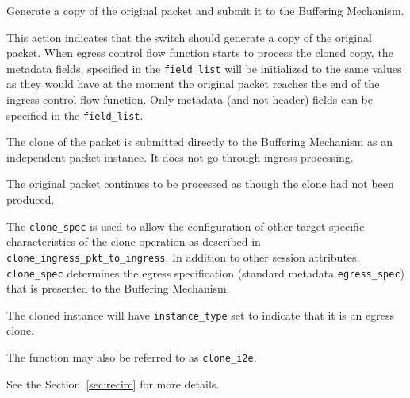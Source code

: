 \documentclass[12pt]{article}
\begin{document}
{ %
Generate a copy of the original packet and submit it to the Buffering Mechanism.
}
{ %
}
{ %
{
\color{red}
This action indicates that the switch should generate a copy of the original packet. When egress control flow function starts to process the cloned copy, the metadata fields, specified in the \texttt{field_list} will be initialized to the same values as they would have at the moment the original packet reaches the end of the ingress control flow function. Only metadata (and not header) fields can be specified in the \texttt{field_list}.
}

The clone of the packet is submitted directly to the Buffering Mechanism as 
an independent packet instance. It does not go through ingress \matchaction 
processing.

The original packet continues to be processed as though the clone had not 
been produced.

The \texttt{clone_spec} is used to allow the configuration of other target specific 
characteristics of the clone operation as described in \texttt{clone_ingress_pkt_to_ingress}. 
In addition to other session attributes, \texttt{clone_spec} determines the egress 
specification (standard metadata \texttt{egress_spec}) that is presented to the 
Buffering Mechanism.

The cloned instance will have \texttt{instance_type} set to indicate that it is an 
egress clone. 

The function may also be referred to as \texttt{clone_i2e}.

See the Section~\ref{sec:recirc} for more details.

}

\end{document}
